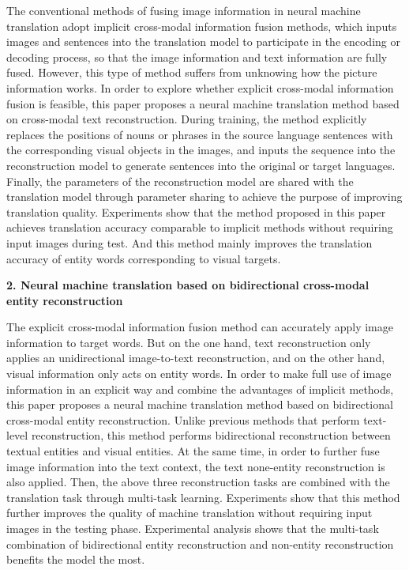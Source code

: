 The conventional methods of fusing image information in neural machine translation adopt implicit cross-modal information fusion methods, which inputs images and sentences into the translation model to participate in the encoding or decoding process, so that the image information and text information are fully fused. However, this type of method suffers from unknowing how the picture information works. In order to explore whether explicit cross-modal information fusion is feasible, this paper proposes a neural machine translation method based on cross-modal text reconstruction. During training, the method explicitly replaces the positions of nouns or phrases in the source language sentences with the corresponding visual objects in the images, and inputs the sequence into the reconstruction model to generate sentences into the original or target languages. Finally, the parameters of the reconstruction model are shared with the translation model through parameter sharing to achieve the purpose of improving translation quality. Experiments show that the method proposed in this paper achieves translation accuracy comparable to implicit methods without requiring input images during test. And this method mainly improves the translation accuracy of entity words corresponding to visual targets.

\textbf{2. Neural machine translation based on bidirectional cross-modal entity reconstruction}

The explicit cross-modal information fusion method can accurately apply image information to target words. But on the one hand, text reconstruction only applies an unidirectional image-to-text reconstruction, and on the other hand, visual information only acts on entity words. In order to make full use of image information in an explicit way and combine the advantages of implicit methods, this paper proposes a neural machine translation method based on bidirectional cross-modal entity reconstruction. Unlike previous methods that perform text-level reconstruction, this method performs bidirectional reconstruction between textual entities and visual entities. At the same time, in order to further fuse image information into the text context, the text none-entity reconstruction is also applied. Then, the above three reconstruction tasks are combined with the translation task through multi-task learning. Experiments show that this method further improves the quality of machine translation without requiring input images in the testing phase. Experimental analysis shows that the multi-task combination of bidirectional entity reconstruction and non-entity reconstruction benefits the model the most.

